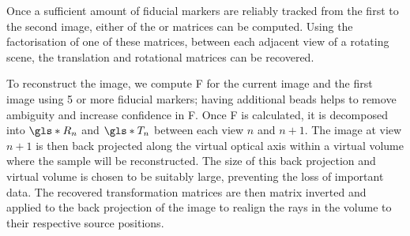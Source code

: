\documentclass[times, twoside, watermark]{zHenriquesLab-StyleBioRxiv}
\begin{document}


Once a sufficient amount of fiducial markers are reliably tracked from the first to the second image, either of the  or  matrices can be computed. Using the factorisation of one of these matrices, between each adjacent view of a rotating scene, the translation and rotational matrices can be recovered.

To reconstruct the image, we compute \gls*{F} for the current image and the first image using 5 or more fiducial markers; having additional beads helps to remove ambiguity and increase confidence in \gls*{F}.
Once \gls*{F} is calculated, it is decomposed into \(\gls*{R}_n\) and \(\gls*{T}_n\) between each view \(n\) and \(n+1\).
The image at view \(n+1\) is then back projected along the virtual optical axis within a virtual volume where the sample will be reconstructed.
The size of this back projection and virtual volume is chosen to be suitably large, preventing the loss of important data.
The recovered transformation matrices are then matrix inverted and applied to the back projection of the image to realign the rays in the volume to their respective source positions. %
\end{document}
